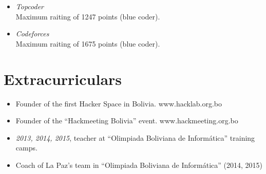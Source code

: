 \documentclass[margin, 10pt]{res} %
\begin{document}
\begin{resume}
\begin{itemize}
\item[] {\sl Topcoder} \\
Maximum raiting of 1247 points (blue coder). \\
\item[] {\sl Codeforces} \\
Maximum raiting of 1675 points (blue coder). \\
\end{itemize}

\section{Extracurriculars}
\begin{itemize}
\item[] Founder of the first Hacker Space in Bolivia. www.hacklab.org.bo \\
\item[] Founder of the ``Hackmeeting Bolivia'' event. www.hackmeeting.org.bo \\
\item[] {\sl 2013, 2014, 2015}, teacher at ``Olimpiada Boliviana de Inform\'atica'' training camps. \\
\item[] Coach of La Paz's team in ``Olimpiada Boliviana de Inform\'atica'' (2014, 2015)\\
\end{itemize}


\end{resume}
\end{document}
